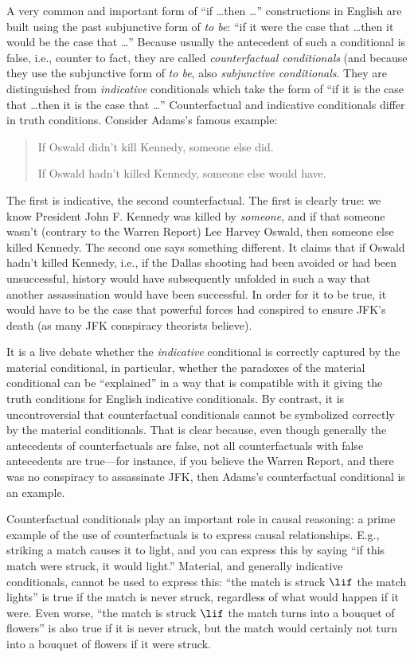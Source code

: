\documentclass[../../../include/open-logic-section]{subfiles}
\begin{document}


A very common and important form of ``if \dots then \dots''
constructions in English are built using the past subjunctive form of
\emph{to be}: ``if it were the case that \dots then it would be the
case that \dots'' Because usually the antecedent of such a conditional
is false, i.e., counter to fact, they are called \emph{counterfactual
  conditionals} (and because they use the subjunctive form of \emph{to
  be}, also \emph{subjunctive conditionals}. They are distinguished
from \emph{indicative} conditionals which take the form of ``if it is
the case that \dots then it is the case that \dots'' Counterfactual and
indicative conditionals differ in truth conditions. Consider Adams's
famous example:
\begin{quote}
  If Oswald didn't kill Kennedy, someone else did.
  
  If Oswald hadn't killed Kennedy, someone else would have.
\end{quote}
The first is indicative, the second counterfactual. The first is
clearly true: we know President John F. Kennedy was killed by \emph{someone}, and if that someone
wasn't (contrary to the Warren Report) Lee Harvey Oswald, then someone
else killed Kennedy. The second one says something different. It claims
that if Oswald hadn't killed Kennedy, i.e., if the Dallas shooting had
been avoided or had been unsuccessful, history would have subsequently
unfolded in such a way that another assassination would have been
successful. In order for it to be true, it would have to be the case
that powerful forces had conspired to ensure JFK's death (as many JFK
conspiracy theorists believe).

It is a live debate whether the \emph{indicative} conditional is
correctly captured by the material conditional, in particular, whether
the paradoxes of the material conditional can be ``explained'' in a
way that is compatible with it giving the truth conditions for English
indicative conditionals. By contrast, it is uncontroversial that
counterfactual conditionals cannot be symbolized correctly by the
material conditionals. That is clear because, even though generally
the antecedents of counterfactuals are false, not all counterfactuals
with false antecedents are true---for instance, if you believe the
Warren Report, and there was no conspiracy to assassinate JFK, then
Adams's counterfactual conditional is an example.

Counterfactual conditionals play an important role in causal
reasoning: a prime example of the use of counterfactuals is to express
causal relationships. E.g., striking a match causes it to light, and
you can express this by saying ``if this match were struck, it would
light.''  Material, and generally indicative conditionals, cannot be
used to express this: ``the match is struck $\lif$ the match lights''
is true if the match is never struck, regardless of what would happen
if it were. Even worse, ``the match is struck $\lif$ the match turns
into a bouquet of flowers'' is also true if it is never struck, but
the match would certainly not turn into a bouquet of flowers if it
were struck.
\end{document}

